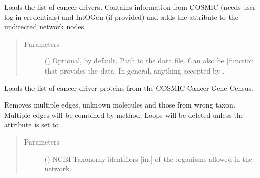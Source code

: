 \documentclass[letterpaper,10pt,english]{sphinxmanual}
\begin{document}
\begin{fulllineitems}
\begin{fulllineitems}
\label{\detokenize{reference:pypath.main.PyPath.cancer_drivers_list}}
Loads the list of cancer drivers. Contains information from
COSMIC (needs user log in credentials) and IntOGen (if provided)
and adds the attribute to the undirected network nodes.
\begin{quote}\begin{description}
\item[{Parameters}] \leavevmode
{} () \textendash{} Optional,  by default. Path to the data file. Can
also be {[}function{]} that provides the data. In general,
anything accepted by
.

\end{description}\end{quote}

\end{fulllineitems}


\begin{fulllineitems}
\label{\detokenize{reference:pypath.main.PyPath.cancer_gene_census_list}}
Loads the list of cancer driver proteins from the COSMIC Cancer
Gene Census.

\end{fulllineitems}


\begin{fulllineitems}
\label{\detokenize{reference:pypath.main.PyPath.clean_graph}}
Removes multiple edges, unknown molecules and those from wrong
taxon. Multiple edges will be combined by
{\hyperref[\detokenize{reference:pypath.main.PyPath.combine_attr}]{}} method.
Loops will be deleted unless the attribute
 is set to .
\begin{quote}\begin{description}
\item[{Parameters}] \leavevmode
{} () \textendash{} NCBI Taxonomy identifiers {[}int{]} of the organisms allowed
in the network.


\end{description}
\end{quote}
\end{fulllineitems}
\end{fulllineitems}
\end{document}
